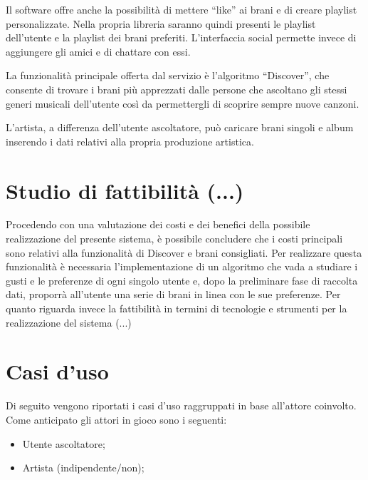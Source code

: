 Il software offre anche la possibilità di mettere ``like'' ai brani e di creare playlist
personalizzate. Nella propria libreria saranno quindi presenti le playlist dell'utente e
la playlist dei brani preferiti. L'interfaccia social permette invece di aggiungere gli
amici e di chattare con essi.

La funzionalità principale offerta dal servizio è l'algoritmo ``Discover'', che consente
di trovare i brani più apprezzati dalle persone che ascoltano gli stessi generi musicali
dell'utente così da permettergli di scoprire sempre nuove canzoni.

L'artista, a differenza dell'utente ascoltatore, può caricare brani singoli e album
inserendo i dati relativi alla propria produzione artistica.

\section{Studio di fattibilità (...)}
Procedendo con una valutazione dei costi e dei benefici della possibile realizzazione del
presente sistema, è possibile concludere che i costi principali sono relativi alla
funzionalità di Discover e brani consigliati. Per realizzare questa funzionalità è
necessaria l'implementazione di un algoritmo che vada a studiare i gusti e le preferenze
di ogni singolo utente e, dopo la preliminare fase di raccolta dati, proporrà all'utente
una serie di brani in linea con le sue preferenze. Per quanto riguarda invece la
fattibilità in termini di tecnologie e strumenti per la realizzazione del sistema (...)

\section{Casi d'uso}
Di seguito vengono riportati i casi d'uso raggruppati in base all'attore coinvolto. Come
anticipato gli attori in gioco sono i seguenti:
\begin{itemize}
    \item Utente ascoltatore;
    \item Artista (indipendente/non);
\end{itemize}

